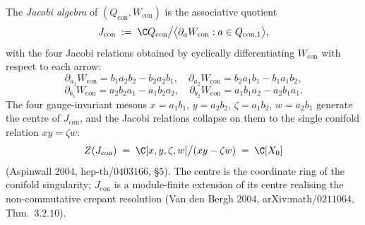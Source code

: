 \begin{definition}
\label{def:jacobi-kw-centre}
The \emph{Jacobi algebra} of $(Q_{\mathrm{con}}, W_{\mathrm{con}})$ is the associative quotient
\[
 J_{\mathrm{con}} \;:=\; \C Q_{\mathrm{con}} \bigl/ \bigl\langle \partial_a W_{\mathrm{con}} : a \in Q_{\mathrm{con},1} \bigr\rangle,
\]
with the four Jacobi relations obtained by cyclically differentiating $W_{\mathrm{con}}$ with respect to each arrow:
\[
 \partial_{a_1} W_{\mathrm{con}} = b_1 a_2 b_2 - b_2 a_2 b_1, \quad \partial_{a_2} W_{\mathrm{con}} = b_2 a_1 b_1 - b_1 a_1 b_2,
\]
\[
 \partial_{b_1} W_{\mathrm{con}} = a_2 b_2 a_1 - a_1 b_2 a_2, \quad \partial_{b_2} W_{\mathrm{con}} = a_1 b_1 a_2 - a_2 b_1 a_1.
\]
The four gauge-invariant mesons $x = a_1 b_1$, $y = a_2 b_2$, $\zeta = a_1 b_2$, $w = a_2 b_1$ generate the centre of $J_{\mathrm{con}}$, and the Jacobi relations collapse on them to the single conifold relation $x y = \zeta w$:
\[
 Z(J_{\mathrm{con}}) \;=\; \C[x, y, \zeta, w] \bigl/ (xy - \zeta w) \;=\; \C[X_0]
\]
(Aspinwall $2004$, hep-th/$0403166$, §$5$). The centre is the coordinate ring of the conifold singularity; $J_{\mathrm{con}}$ is a module-finite extension of its centre realising the non-commutative crepant resolution (Van den Bergh $2004$, arXiv:math/$0211064$, Thm.~$3.2.10$).
\end{definition}

